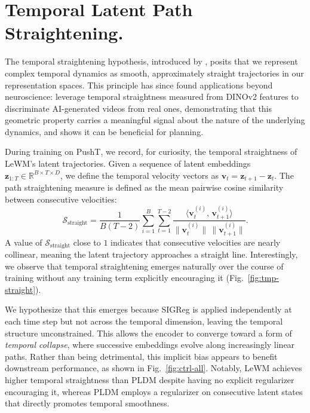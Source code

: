 \section{Temporal Latent Path Straightening.}
\label{appendix:tmp-straight}

The temporal straightening hypothesis, introduced by \citet{henaff2019perceptual}, posits that we represent complex temporal dynamics as smooth, approximately straight trajectories in our representation spaces. This principle has since found applications beyond neuroscience: \citet{interno2025aigenerated} leverage temporal straightness measured from DINOv2 features to discriminate AI-generated videos from real ones, demonstrating that this geometric property carries a meaningful signal about the nature of the underlying dynamics, and \citet{wang2026temporal} shows it can be beneficial for planning.

During training on PushT, we record, for curiosity, the temporal straightness of LeWM's latent trajectories. Given a sequence of latent embeddings $\mathbf{z}_{1:T} \in \mathbb{R}^{B \times T \times D}$, we define the temporal velocity vectors as $\mathbf{v}_t = \mathbf{z}_{t+1} - \mathbf{z}_t$. The path straightening measure is defined as the mean pairwise cosine similarity between consecutive velocities:
\begin{equation}
    \mathcal{S}_{\text{straight}} = \frac{1}{B(T-2)} \sum_{i=1}^{B} \sum_{t=1}^{T-2} \frac{\langle \mathbf{v}_t^{(i)},\, \mathbf{v}_{t+1}^{(i)} \rangle}{\|\mathbf{v}_t^{(i)}\| \, \|\mathbf{v}_{t+1}^{(i)}\|}.
    \label{eq:path-straightening}
\end{equation}
A value of $\mathcal{S}_{\text{straight}}$ close to $1$ indicates that consecutive velocities are nearly collinear, meaning the latent trajectory approaches a straight line. Interestingly, we observe that temporal straightening emerges naturally over the course of training without any training term explicitly encouraging it (Fig.~\ref{fig:tmp-straight}). 

We hypothesize that this emerges because SIGReg is applied independently at each time step but not across the temporal dimension, leaving the temporal structure unconstrained. This allows the encoder to converge toward a form of \emph{temporal collapse}, where successive embeddings evolve along increasingly linear paths. Rather than being detrimental, this implicit bias appears to benefit downstream performance, as shown in Fig.~\ref{fig:ctrl-all}. Notably, LeWM achieves higher temporal straightness than PLDM despite having no explicit regularizer encouraging it, whereas PLDM employs a regularizer on consecutive latent states that directly promotes temporal smoothness.


